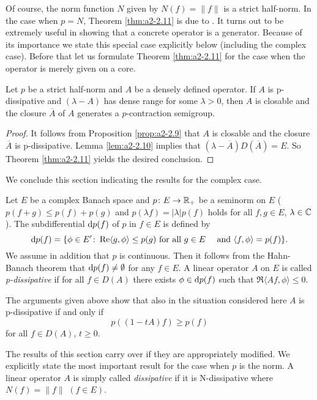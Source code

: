 Of course, the norm function $N$ given by $N(f) = \|f\|$ is a strict half-norm.
In the case when $p = N$, Theorem \ref{thm:a2-2.11}    
is due to \citet{lumerphillips:1961}.
It turns out to be extremely useful in showing that a concrete operator is a generator.
Because of its importance we state this special case explicitly below (including the complex case).
Before that let us formulate Theorem \ref{thm:a2-2.11}   
for the case when the operator is merely given on a core.

\begin{corollary}\label{cor:a2-2.12}
Let $p$ be a strict half-norm and $A$ be a densely defined operator.
If $A$ is p-dissipative and $(\lambda - A)$ has dense range for some $\lambda > 0$, then $A$ is closable and the closure $\overline{A}$ of $A$ generates a $p$-contraction semigroup.
\end{corollary}
\begin{proof}
It follows from Proposition \ref{prop:a2-2.9}  
that $A$ is closable and the closure $\overline{A}$ is p-dissipative.
Lemma \ref{lem:a2-2.10}   
implies that $(\lambda- \overline{A})D(\overline{A}) = E$.
So Theorem \ref{thm:a2-2.11}   
yields the desired conclusion.
\end{proof}
We conclude this section indicating the results for the complex case.

Let $E$ be a complex Banach space and $p \colon E \to \mathbb{R}_{+}$ 
be a seminorm on $E$ (\ie $p(f + g) \leq p(f) + p(g)$ and $p(\lambda f) = |\lambda|p(f)$ holds for all $f, g \in E$, $\lambda \in \mathbb{C}$).
The subdifferential $\mathop{}\!\mathrm{d}{p}(f)$ of $p$ in $f \in E$ is defined by
\begin{equation}\label{eq:a2-4.15}
\mathop{}\!\mathrm{d}{p}(f) = \{\phi \in E' \colon \mathop{}\!\mathrm{Re}\langle g,\phi \rangle \leq p(g) \text{ for all } g \in E \quad \text{ and } \langle f,\phi \rangle = p(f)  \}.
\end{equation}
We assume in addition that $p$ is continuous.
Then it follows from the Hahn-Banach theorem that $\mathop{}\!\mathrm{d}{p}(f) \neq \emptyset$ for any $f \in E$.
A linear operator $A$ on $E$ is called \emph{p-dissipative} if for all $f \in D(A)$ there exists $\phi \in \mathop{}\!\mathrm{d}{p}(f)$ such that $\Re\langle Af,\phi \rangle \leq 0$.

The arguments given above show that also in the situation considered here $A$ is p-dissipative if and only if
\[
    p((1-tA)f) \geq p(f)
\]
for all $f \in D(A)$, $t \geq 0$.

The results of this section carry over if they are appropriately modified.
We explicitly state the most important result for the case when $p$ is the norm.
A linear operator $A$ is simply called \emph{dissipative} if it is N-dissipative where $N(f) = \|f\|$ $(f \in E)$.

